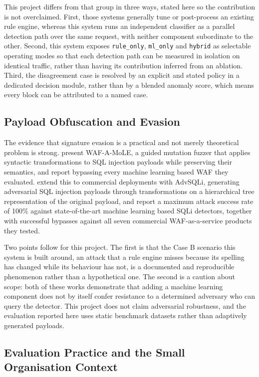 \documentclass[runningheads]{llncs}
\begin{document}
This project differs from that group in three ways, stated here so the
contribution is not overclaimed. First, those systems generally tune or
post-process an existing rule engine, whereas this system runs an
independent classifier as a parallel detection path over the same
request, with neither component subordinate to the other. Second, this
system exposes \texttt{rule\_only}, \texttt{ml\_only} and
\texttt{hybrid} as selectable operating modes so that each detection
path can be measured in isolation on identical traffic, rather than
having its contribution inferred from an ablation. Third, the
disagreement case is resolved by an explicit and stated policy in a
dedicated decision module, rather than by a blended anomaly score,
which means every block can be attributed to a named case.

\subsection{Payload Obfuscation and Evasion}

The evidence that signature evasion is a practical and not merely
theoretical problem is strong. \citet{demetrio2020} present
WAF-A-MoLE, a guided mutation fuzzer that applies syntactic
transformations to SQL injection payloads while preserving their
semantics, and report bypassing every machine learning based WAF they
evaluated. \citet{qu2024} extend this to commercial deployments with
AdvSQLi, generating adversarial SQL injection payloads through
transformations on a hierarchical tree representation of the original
payload, and report a maximum attack success rate of 100\% against
state-of-the-art machine learning based SQLi detectors, together with
successful bypasses against all seven commercial WAF-as-a-service
products they tested.

Two points follow for this project. The first is that the Case B
scenario this system is built around, an attack that a rule engine
misses because its spelling has changed while its behaviour has not, is
a documented and reproducible phenomenon rather than a hypothetical
one. The second is a caution about scope: both of these works
demonstrate that adding a machine learning component does not by itself
confer resistance to a determined adversary who can query the detector.
This project does not claim adversarial robustness, and the evaluation
reported here uses static benchmark datasets rather than adaptively
generated payloads.

\subsection{Evaluation Practice and the Small Organisation Context}
\end{document}
